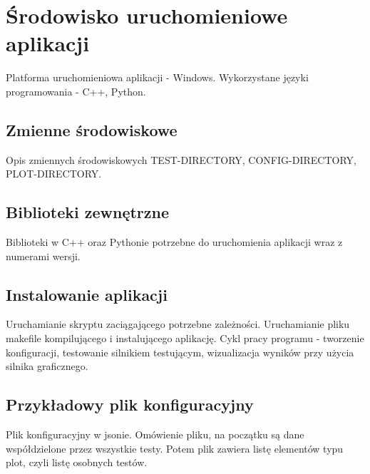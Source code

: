 \chapter{Środowisko uruchomieniowe aplikacji}
\thispagestyle{chapterBeginStyle}
Platforma uruchomieniowa aplikacji - Windows. Wykorzystane języki programowania - C++, Python.

\section{Zmienne środowiskowe}
Opis zmiennych środowiskowych TEST-DIRECTORY, CONFIG-DIRECTORY, PLOT-DIRECTORY.


\section{Biblioteki zewnętrzne}
Biblioteki w C++ oraz Pythonie potrzebne do uruchomienia aplikacji wraz z numerami wersji.

\section{Instalowanie aplikacji}
Uruchamianie skryptu zaciągającego potrzebne zależności.
Uruchamianie pliku makefile kompilującego i instalującego aplikację.
Cykl pracy programu - tworzenie konfiguracji, testowanie silnikiem testującym, wizualizacja wyników przy użycia
silnika graficznego.

\section{Przykładowy plik konfiguracyjny}
Plik konfiguracyjny w jsonie. Omówienie pliku, na początku są dane współdzielone przez wszystkie testy.
Potem plik zawiera listę elementów typu plot, czyli listę osobnych testów.

